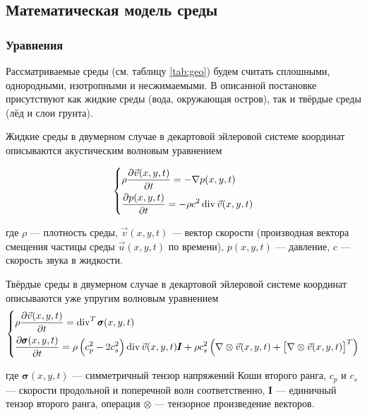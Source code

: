 \subsection{Математическая модель среды}

\subsubsection{Уравнения}

Рассматриваемые среды (см. таблицу \autoref{tab:geo}) будем считать сплошными, однородными, изотропными и несжимаемыми. В описанной постановке присутствуют как жидкие среды (вода, окружающая остров), так и твёрдые среды (лёд и слои грунта).

Жидкие среды в двумерном случае в декартовой эйлеровой системе координат описываются акустическим волновым уравнением

\begin{equation}
    \begin{dcases}
        \rho \frac{\partial \vec{v}(x,y,t)}{\partial t} = -\nabla p (x,y,t) \\
        \frac{\partial p(x,y,t)}{\partial t} = -\rho c^2 \operatorname{div} \vec{v}(x,y,t)
    \end{dcases}
    \label{eq:acoustic_wave_eq}
\end{equation}

где $\rho$ --- плотность среды, $\vec{v}(x,y,t)$ --- вектор скорости (производная вектора смещения частицы среды $\vec{u}(x,y,t)$ по времени), $p(x,y,t)$ --- давление, $c$ --- скорость звука в жидкости.

Твёрдые среды в двумерном случае в декартовой эйлеровой системе координат описываются уже  упругим волновым уравнением
\begin{equation}
    \begin{dcases}
        \rho \frac{\partial \vec{v}(x,y,t)}{\partial t} = \operatorname{div}^T \pmb{\sigma} (x,y,t) \\
        \frac{\partial \pmb{\sigma}(x,y,t)}{\partial t} = \rho \left(c_p^2 - 2c_s^2\right) \operatorname{div} \vec{v}(x,y,t) \pmb{I} + \rho c_s^2 \left(\nabla \otimes \vec{v}(x,y,t) + \left[ \nabla \otimes \vec{v}(x,y,t)\right]^T \right)
    \end{dcases}
    \label{eq:elastic_wave_eq}
\end{equation}

где $\pmb{\sigma}(x,y,t)$ --- симметричный тензор напряжений Коши второго ранга, $c_p$ и $c_s$ --- скорости продольной и поперечной волн соответственно, $\pmb{I}$ --- единичный тензор второго ранга, операция $\otimes$ --- тензорное произведение векторов.

